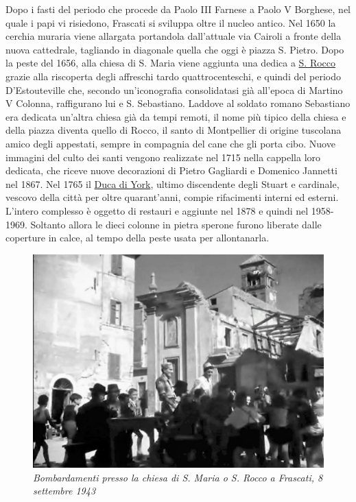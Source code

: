 \documentclass[
  letterpaper,
  DIV=11,
  numbers=noendperiod]{scrartcl}
\begin{document}
Dopo i fasti del periodo che procede da Paolo III Farnese a Paolo V
Borghese, nel quale i papi vi risiedono, Frascati si sviluppa oltre il
nucleo antico. Nel 1650 la cerchia muraria viene allargata portandola
dall'attuale via Cairoli a fronte della nuova cattedrale, tagliando in
diagonale quella che oggi è piazza S. Pietro. Dopo la peste del 1656,
alla chiesa di S. Maria viene aggiunta una dedica a \hyperref[0]{S.
Rocco} grazie alla riscoperta degli affreschi tardo quattrocenteschi, e
quindi del periodo D'Estouteville che, secondo un'iconografia
consolidatasi già all'epoca di Martino V Colonna, raffigurano lui e S.
Sebastiano. Laddove al soldato romano Sebastiano era dedicata un'altra
chiesa già da tempi remoti, il nome più tipico della chiesa e della
piazza diventa quello di Rocco, il santo di Montpellier di origine
tuscolana amico degli appestati, sempre in compagnia del cane che gli
porta cibo. Nuove immagini del culto dei santi vengono realizzate nel
1715 nella cappella loro dedicata, che riceve nuove decorazioni di
Pietro Gagliardi e Domenico Jannetti nel 1867. Nel 1765 il
\hyperref[0]{Duca di York}, ultimo discendente degli Stuart e cardinale,
vescovo della città per oltre quarant'anni, compie rifacimenti interni
ed esterni. L'intero complesso è oggetto di restauri e aggiunte nel 1878
e quindi nel 1958-1969. Soltanto allora le dieci colonne in pietra
sperone furono liberate dalle coperture in calce, al tempo della peste
usata per allontanarla.

\begin{figure}[H]

{\centering \includegraphics{../../images/2024/san_rocco/6san-rocco-bombe.jpg}

}

\caption{\emph{Bombardamenti presso la chiesa di S. Maria o S. Rocco a
Frascati, 8 settembre 1943}}

\end{figure}%
\end{document}
